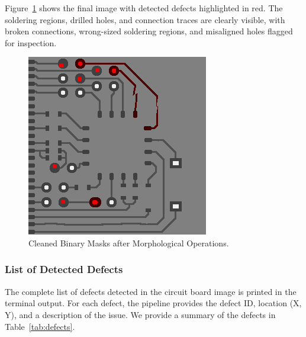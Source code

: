 \documentclass[a4paper,12pt]{article}
\begin{document}
Figure~\ref{fig:final_image} shows the final image with detected defects highlighted in red. The soldering regions, drilled holes, and connection traces are clearly visible, with broken connections, wrong-sized soldering regions, and misaligned holes flagged for inspection.

\begin{figure}[!htbp]
    \centering
    \includegraphics[width=0.5\linewidth]{data/output/circuit_board_qa/final_image.png}
    \caption{Cleaned Binary Masks after Morphological Operations.}
    \label{fig:final_image}
\end{figure}

\subsubsection{List of Detected Defects}

The complete list of defects detected in the circuit board image is printed in the terminal output. For each defect, the pipeline provides the defect ID, location (X, Y), and a description of the issue. We provide a summary of the defects in Table~\ref{tab:defects}.
\end{document}
